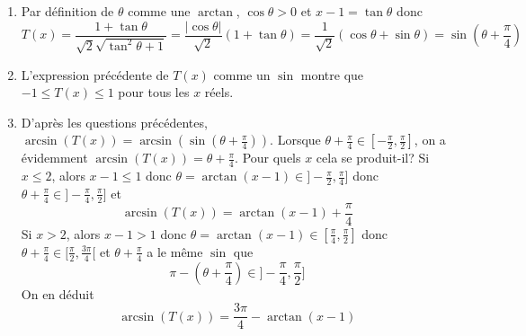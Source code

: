 \begin{enumerate}
 \item Par définition de $\theta$ comme une $\arctan$, $\cos \theta >0$ et $x-1=\tan \theta$ donc
\begin{displaymath}
 T(x) = \frac{1+ \tan \theta}{\sqrt{2}\sqrt{\tan^2\theta +1}}=\frac{|\cos\theta|}{\sqrt{2}}(1+\tan \theta)
=\frac{1}{\sqrt{2}}(\cos \theta + \sin\theta)
=\sin\left( \theta + \frac{\pi}{4}\right) 
\end{displaymath}
 
 \item L'expression précédente de $T(x)$ comme un $\sin$ montre que $-1\leq T(x) \leq 1$ pour tous les $x$ réels.

 \item D'après les questions précédentes, $\arcsin(T(x)) = \arcsin(\sin(\theta +\frac{\pi}{4}))$.\newline
Lorsque $\theta +\frac{\pi}{4}\in [-\frac{\pi}{2},\frac{\pi}{2}]$, on a évidemment $\arcsin(T(x)) = \theta +\frac{\pi}{4}$. Pour quels $x$ cela se produit-il?\newline
Si $x\leq 2$, alors $x-1\leq 1$ donc $\theta = \arctan(x-1) \in ]-\frac{\pi}{2},\frac{\pi}{4}]$ donc $\theta +\frac{\pi}{4}\in ]-\frac{\pi}{4},\frac{\pi}{2}]$ et
\begin{displaymath}
 \arcsin(T(x)) = \arctan(x-1) +\frac{\pi}{4}
\end{displaymath}
Si $x> 2$, alors $x-1 > 1$ donc $\theta = \arctan(x-1) \in [\frac{\pi}{4},\frac{\pi}{2}]$ donc $\theta +\frac{\pi}{4}\in [\frac{\pi}{2},\frac{3\pi}{4}[$ et
$\theta +\frac{\pi}{4}$ a le même $\sin$ que 
\begin{displaymath}
 \pi -\left( \theta +\frac{\pi}{4}\right) \in
]-\frac{\pi}{4},\frac{\pi}{2}]
\end{displaymath}
On en déduit  
\begin{displaymath}
 \arcsin(T(x)) = \frac{3\pi}{4} -\arctan(x-1) 
\end{displaymath}



\end{enumerate}
